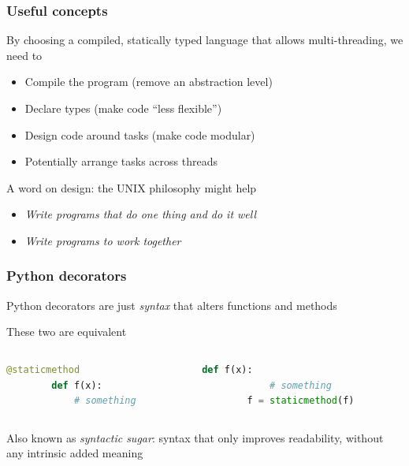 \documentclass[10pt, aspectratio=1610]{beamer}
\begin{document}
\begin{frame}
  \frametitle{Useful concepts}

  By choosing a compiled, statically typed language that allows multi-threading, we need to

  \begin{itemize}
    \item Compile the program (remove an abstraction level)
    \item Declare types (make code ``less flexible'')
    \item Design code around tasks (make code modular)
    \item Potentially arrange tasks across threads
  \end{itemize}

  \vfill

  A word on design: the UNIX philosophy might help
  \begin{itemize}
    \item \emph{Write programs that do one thing and do it well}
    \item \emph{Write programs to work together}
  \end{itemize}

\end{frame}

\begin{frame}[fragile]
  \frametitle{Python decorators}

  Python decorators are just \emph{syntax} that alters functions and methods

  \vfill

  These two are equivalent

  \begin{columns}
    \begin{column}{0.4\textwidth}
      \begin{lstlisting}[language=python]
        @staticmethod
        def f(x):
            # something
      \end{lstlisting}
    \end{column}
    \begin{column}{0.4\textwidth}
      \begin{lstlisting}[language=python]
        def f(x):
            # something
        f = staticmethod(f)
      \end{lstlisting}
    \end{column}
  \end{columns}

  \vfill

  Also known as \emph{syntactic sugar}: syntax that only improves readability, without any intrinsic added meaning

\end{frame}
\end{document}
